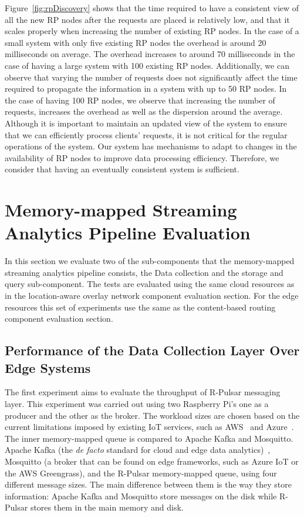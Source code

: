 Figure~\ref{fig:rpDiscovery} shows that the time required to have a consistent view of all the new RP nodes after the requests are placed is relatively low, and that it scales properly when increasing the number of existing RP nodes. In the case of a small system with only five existing RP nodes the overhead is around 20 milliseconds on average. The overhead increases to around 70 milliseconds in the case of having a large system with 100 existing RP nodes. Additionally, we can observe that varying the number of requests does not significantly affect the time required to propagate the information in a system with up to 50 RP nodes. In the case of having 100 RP nodes, we observe that increasing the number of requests, increases the overhead as well as the dispersion around the average. Although it is important to maintain an updated view of the system to ensure that we can efficiently process clients' requests, it is not critical for the regular operations of the system. Our system has mechanisms to adapt to changes in the availability of RP nodes to improve data processing efficiency. Therefore, we consider that having an eventually consistent system is sufficient. 

\section{Memory-mapped Streaming Analytics Pipeline Evaluation}

In this section we evaluate two of the sub-components that the memory-mapped streaming analytics pipeline consists, the Data collection and the storage and query sub-component. The tests are evaluated using the same cloud resources as in the location-aware overlay network component evaluation section. For the edge resources this set of experiments use the same as the content-based routing component evaluation section. 

\subsection{Performance of the Data Collection Layer Over Edge Systems}

The first experiment aims to evaluate the throughput of R-Pulsar messaging layer. This experiment was carried out using two Raspberry Pi's one as a producer and the other as the broker. The workload sizes are chosen based on the current limitations imposed by existing IoT services, such as AWS~\cite{AWS-MQTT} and Azure~\cite{AZURE-MQTT}. The inner memory-mapped queue is compared to Apache Kafka and Mosquitto. Apache Kafka (the \textit{de facto} standard for cloud and edge data analytics)~\cite{Young2017, firework, planner}, Mosquitto (a broker that can be found on edge frameworks, such as Azure IoT or the AWS Greengrass), and the R-Pulsar memory-mapped queue, using four different message sizes.  The main difference between them is the way they store information: Apache Kafka and Mosquitto store messages on the disk while R-Pulsar stores them in the main memory and disk. 

